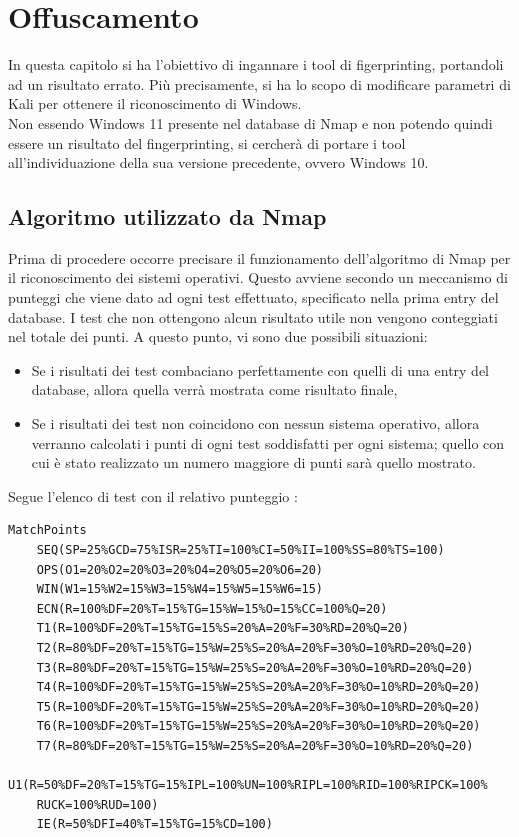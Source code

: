 \chapter{Offuscamento}

In questa capitolo si ha l'obiettivo di ingannare i tool di figerprinting, portandoli ad un risultato errato. Più precisamente, si ha lo scopo di modificare parametri di Kali per ottenere il riconoscimento di Windows.
\\
Non essendo Windows 11 presente nel database di Nmap e non potendo quindi essere un risultato del fingerprinting, si cercherà di portare i tool all'individuazione della sua versione precedente, ovvero Windows 10.

\section{Algoritmo utilizzato da Nmap} \label{algoritmi}
Prima di procedere occorre precisare il funzionamento dell'algoritmo di Nmap per il riconoscimento dei sistemi operativi. Questo avviene secondo un meccanismo di punteggi che viene dato ad ogni test effettuato, specificato nella prima entry del database. I test che non ottengono alcun risultato utile non vengono conteggiati nel totale dei punti.
A questo punto, vi sono due possibili situazioni:
\begin{itemize}
	\item Se i risultati dei test combaciano perfettamente con quelli di una entry del database, allora quella verrà mostrata come risultato finale,
	\item Se i risultati dei test non coincidono con nessun sistema operativo, allora verranno calcolati i punti di ogni test soddisfatti per ogni sistema; quello con cui è stato realizzato un numero maggiore di punti sarà quello mostrato.
\end{itemize}

Segue l'elenco di test con il relativo punteggio :

\begin{lstlisting}[caption={Punteggi che Nmap attrribuisce ad ogni test \cite{punti_nmap}}]
	MatchPoints
	SEQ(SP=25%GCD=75%ISR=25%TI=100%CI=50%II=100%SS=80%TS=100)
	OPS(O1=20%O2=20%O3=20%O4=20%O5=20%O6=20)
	WIN(W1=15%W2=15%W3=15%W4=15%W5=15%W6=15)
	ECN(R=100%DF=20%T=15%TG=15%W=15%O=15%CC=100%Q=20)
	T1(R=100%DF=20%T=15%TG=15%S=20%A=20%F=30%RD=20%Q=20)
	T2(R=80%DF=20%T=15%TG=15%W=25%S=20%A=20%F=30%O=10%RD=20%Q=20)
	T3(R=80%DF=20%T=15%TG=15%W=25%S=20%A=20%F=30%O=10%RD=20%Q=20)
	T4(R=100%DF=20%T=15%TG=15%W=25%S=20%A=20%F=30%O=10%RD=20%Q=20)
	T5(R=100%DF=20%T=15%TG=15%W=25%S=20%A=20%F=30%O=10%RD=20%Q=20)
	T6(R=100%DF=20%T=15%TG=15%W=25%S=20%A=20%F=30%O=10%RD=20%Q=20)
	T7(R=80%DF=20%T=15%TG=15%W=25%S=20%A=20%F=30%O=10%RD=20%Q=20)
	U1(R=50%DF=20%T=15%TG=15%IPL=100%UN=100%RIPL=100%RID=100%RIPCK=100%
	RUCK=100%RUD=100)
	IE(R=50%DFI=40%T=15%TG=15%CD=100)
\end{lstlisting}

